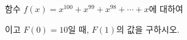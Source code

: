 함수 $f(x)=x^{100}+x^{99}+x^{98}+\cdots+x$에 대하여 \par\smallskip{}\par\smallskip\noindent 이고 $F(0)=10$일 때, $F(1)$의 값을 구하시오.
